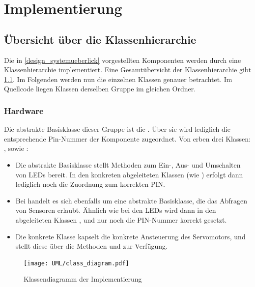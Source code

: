 \chapter{Implementierung}\label{k_implementierung}
\section{Übersicht über die Klassenhierarchie}
Die in \cref{design_systemueberlick} vorgestellten Komponenten werden durch eine Klassenhierarchie implementiert.
Eine Gesamtübersicht der Klassenhierarchie gibt \cref{uml:class_diagram}.
Im Folgenden werden nun die einzelnen Klassen genauer betrachtet.
Im Quellcode liegen Klassen derselben Gruppe im gleichen Ordner.

\subsection{Hardware}
Die abstrakte Basisklasse dieser Gruppe ist die .
Über sie wird lediglich die entsprechende Pin-Nummer der Komponente zugeordnet.
Von  erben drei Klassen: ,  sowie :

\begin{itemize}
	\item Die abstrakte Basisklasse  stellt Methoden zum Ein-, Aus- und Umschalten von LEDs bereit.
In den konkreten abgeleiteten Klassen (wie ) erfolgt dann lediglich noch die Zuordnung zum korrekten PIN.
	\item Bei  handelt es sich ebenfalls um eine abstrakte Basisklasse, die das Abfragen von Sensoren erlaubt.
Ähnlich wie bei den LEDs wird dann in den abgeleiteten Klassen ,  und  nur noch die PIN-Nummer korrekt gesetzt.
	\item Die konkrete Klasse  kapselt die konkrete Ansteuerung des Servomotors, und stellt diese über die Methoden  und  zur Verfügung.
\end{itemize}

\begin{figure}[htb!] \centering
	\texttt{[image: UML/class\_diagram.pdf]}
	\caption{Klassendiagramm der Implementierung}
	\label{uml:class_diagram}
\end{figure}

